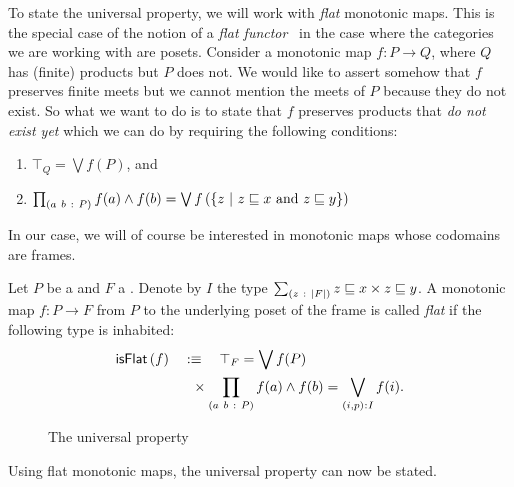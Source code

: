 To state the universal property, we will work with \emph{flat} monotonic maps. This is the
special case of the notion of a \emph{flat functor}~\cite{nlab-flat-functor} in the case
where the categories we are working with are posets. Consider a monotonic map $f : P \rightarrow Q$,
where $Q$ has (finite) products but $P$ does not. We would like to assert somehow that $f$
preserves finite meets but we cannot mention the meets of $P$ because they do not exist.
So what we want to do is to state that $f$ preserves products that \emph{do not exist yet}
which we can do by requiring the following conditions:
\begin{enumerate}
  \item $\top_Q = \bigvee f(P)$, and
  \item $\prod_{(a~b~:~P)} f(a) \wedge f(b) =
           \bigvee f \left( \left\{ z~|~ z \sqsubseteq x\ \text{and}\ z \sqsubseteq y \right\} \right)$
\end{enumerate}

In our case, we will of course be interested in monotonic maps whose codomains are frames.
\begin{defn}\label{defn:flat}
  Let $P$ be a \verposet{} and $F$ a \verframe{}. Denote by $I$ the type
  $\sum_{(z~:~\left| F \right|)} z \sqsubseteq x \times z \sqsubseteq y$.
  A monotonic map $f : P \rightarrow F$ from $P$
  to the underlying poset of the frame is called \emph{flat} if the following type is
  inhabited: 
  \begin{align*}
    \mathsf{isFlat}\left(f\right) \quad&:\equiv\quad \top_F = \bigvee f(P)\\
                &\hspace{0.6em}\times
                \prod_{(a~b~:~P)} f(a) \wedge f(b) = \bigvee_{(i, p)\hspace{0.1mm}:\hspace{0.1mm}I} f(i).
  \end{align*}
\end{defn}

\begin{figure}
  \centering
  \caption{The universal property}
\end{figure}

Using flat monotonic maps, the universal property can now be stated.

